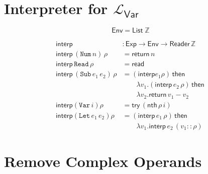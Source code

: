 \documentclass{paper}
\newcommand{\key}[1]{\texttt{#1}}
\newcommand{\Lang}{\mathcal{L}}
\newcommand{\LangVar}{$\Lang_{\mathsf{Var}}$} %
\newcommand{\Exp}{\mathsf{Exp}}
\newcommand{\app}{\,}
\newcommand{\VAR}[1]{\key{Var}\app #1}
\newcommand{\NUM}[1]{\key{Num}\app #1}
\newcommand{\SUB}[2]{\key{Sub}\app #1 \app #2}
\newcommand{\LET}[2]{\key{Let}\app#1\app#2}
\newcommand{\READ}{\key{Read}}
\newcommand{\DOREAD}{\mathsf{read}}
\newcommand{\READER}[1]{\mathsf{Reader}\app #1}
\newcommand{\TRY}{\mathsf{try}}
\newcommand{\THEN}{\,\mathsf{then}\,}
\newcommand{\RETURN}[1]{\mathsf{return}\app #1}
\newcommand{\INTERP}{\mathsf{interp}}
\begin{document}
\section{Interpreter for \LangVar{}}

\[
\mathsf{Env} = \mathsf{List}\;\mathbb{Z}
\]

\begin{align*}
\INTERP &: \Exp \to \mathsf{Env} \to \READER{\mathbb{Z}} \\
\INTERP \app (\NUM{n}) \app \rho &= \RETURN{n} \\
\INTERP \app \READ \app \rho &= \DOREAD \\
\INTERP \app (\SUB{e_1}{e_2}) \app \rho &= 
 (\INTERP e_1 \rho) \THEN \\
& \qquad \lambda v_1 . (\INTERP \app e_2 \app \rho) \THEN \\
& \qquad \lambda v_2 . \RETURN{v_1 - v_2} \\
\INTERP (\VAR{i}) \rho & = \TRY \app (\mathsf{nth} \app \rho \app i) \\
\INTERP (\LET{e_1}{e_2}) \rho & = (\INTERP \app e_1 \app \rho) \THEN \\
& \qquad \lambda v_1 . \INTERP \app e_2 \app (v_1 :: \rho)
\end{align*}


\section{Remove Complex Operands}
\end{document}

